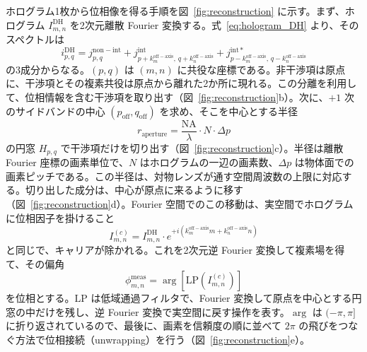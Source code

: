 ホログラム1枚から位相像を得る手順を図~\ref{fig:reconstruction} に示す\cite{takeda1982fourier}。まず、ホログラム $I^{\mathrm{DH}}_{m,n}$ を2次元離散 Fourier 変換する。式~\eqref{eq:hologram_DH} より、そのスペクトルは
\begin{equation}
i_{p,q}^{\mathrm{DH}} = j_{p,q}^{\mathrm{non-int}} + j_{p+k_m^{\mathrm{off-axis}},\, q+k_n^{\mathrm{off-axis}}}^{\mathrm{int}} + j_{p-k_m^{\mathrm{off-axis}},\, q-k_n^{\mathrm{off-axis}}}^{\mathrm{int}*}
\end{equation}
の3成分からなる。$(p,q)$ は $(m,n)$ に共役な座標である。非干渉項は原点に、干渉項とその複素共役は原点から離れた2か所に現れる。この分離を利用して、位相情報を含む干渉項を取り出す（図~\ref{fig:reconstruction}b）。次に、$+1$ 次のサイドバンドの中心 $(p_{\mathrm{off}}, q_{\mathrm{off}})$ を求め、そこを中心とする半径
\begin{equation}
r_{\mathrm{aperture}} = \frac{\mathrm{NA}}{\lambda} \cdot N \cdot \Delta p
\end{equation}
の円窓 $H_{p,q}$ で干渉項だけを切り出す（図~\ref{fig:reconstruction}c）。半径は離散 Fourier 座標の画素単位で、$N$ はホログラムの一辺の画素数、$\Delta p$ は物体面での画素ピッチである。この半径は、対物レンズが通す空間周波数の上限に対応する。切り出した成分は、中心が原点に来るように移す（図~\ref{fig:reconstruction}d）。Fourier 空間でのこの移動は、実空間でホログラムに位相因子を掛けること
\begin{equation}
I_{m,n}^{(c)} = I_{m,n}^{\mathrm{DH}} \cdot e^{+i(k_m^{\mathrm{off-axis}}m + k_n^{\mathrm{off-axis}}n)}
\end{equation}
と同じで、キャリアが除かれる。これを2次元逆 Fourier 変換して複素場を得て、その偏角
\begin{equation}
\phi_{m,n}^{\mathrm{meas}} = \arg[\mathrm{LP}(I_{m,n}^{(c)})]
\end{equation}
を位相とする。$\mathrm{LP}$ は低域通過フィルタで、Fourier 変換して原点を中心とする円窓の中だけを残し、逆 Fourier 変換で実空間に戻す操作を表す。$\arg$ は $(-\pi, \pi]$ に折り返されているので、最後に、画素を信頼度の順に並べて $2\pi$ の飛びをつなぐ方法\cite{herraez2002fast}で位相接続（unwrapping）を行う（図~\ref{fig:reconstruction}e）。

